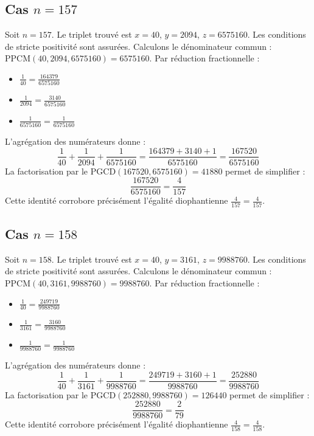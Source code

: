 \documentclass[11pt,a4paper]{article}
\begin{document}
\subsection{Cas $n = 157$}
Soit $n = 157$. Le triplet trouvé est $x = 40$, $y = 2094$, $z = 6575160$.
Les conditions de stricte positivité sont assurées.
Calculons le dénominateur commun : $\text{PPCM}(40, 2094, 6575160) = 6575160$.
Par réduction fractionnelle :
\begin{itemize}
    \item $\frac{1}{40} = \frac{164379}{6575160}$
    \item $\frac{1}{2094} = \frac{3140}{6575160}$
    \item $\frac{1}{6575160} = \frac{1}{6575160}$
\end{itemize}
L'agrégation des numérateurs donne :
$$ \frac{1}{40} + \frac{1}{2094} + \frac{1}{6575160} = \frac{164379 + 3140 + 1}{6575160} = \frac{167520}{6575160} $$
La factorisation par le $\text{PGCD}(167520, 6575160) = 41880$ permet de simplifier :
$$ \frac{167520}{6575160} = \frac{4}{157} $$
Cette identité corrobore précisément l'égalité diophantienne $\frac{4}{157} = \frac{4}{157}$.

\subsection{Cas $n = 158$}
Soit $n = 158$. Le triplet trouvé est $x = 40$, $y = 3161$, $z = 9988760$.
Les conditions de stricte positivité sont assurées.
Calculons le dénominateur commun : $\text{PPCM}(40, 3161, 9988760) = 9988760$.
Par réduction fractionnelle :
\begin{itemize}
    \item $\frac{1}{40} = \frac{249719}{9988760}$
    \item $\frac{1}{3161} = \frac{3160}{9988760}$
    \item $\frac{1}{9988760} = \frac{1}{9988760}$
\end{itemize}
L'agrégation des numérateurs donne :
$$ \frac{1}{40} + \frac{1}{3161} + \frac{1}{9988760} = \frac{249719 + 3160 + 1}{9988760} = \frac{252880}{9988760} $$
La factorisation par le $\text{PGCD}(252880, 9988760) = 126440$ permet de simplifier :
$$ \frac{252880}{9988760} = \frac{2}{79} $$
Cette identité corrobore précisément l'égalité diophantienne $\frac{4}{158} = \frac{4}{158}$.
\end{document}
